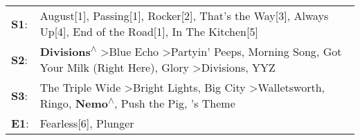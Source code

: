 \begin{supertabular}{p{0.03\textwidth}p{0.92\textwidth}}
 \textbf{S1}:  &                                                                               August[1]\textsuperscript{}, \enspace Passing[1]\textsuperscript{}, \enspace Rocker[2]\textsuperscript{}, \enspace That's the Way[3]\textsuperscript{}, \enspace Always Up[4]\textsuperscript{}, \enspace End of the Road[1]\textsuperscript{}, \enspace In The Kitchen[5]\textsuperscript{}  \enspace  \\
 \textbf{S2}:  &  \textbf{Divisions\textsuperscript{$\wedge$}} \textgreater \enspace Blue Echo\textsuperscript{} \textgreater \enspace Partyin' Peeps\textsuperscript{}, \enspace Morning Song\textsuperscript{}, \enspace Got Your Milk (Right Here)\textsuperscript{}, \enspace Glory\textsuperscript{} \textgreater \enspace Divisions\textsuperscript{}, \enspace YYZ\textsuperscript{}  \enspace  \\
 \textbf{S3}:  &                                                 The Triple Wide\textsuperscript{} \textgreater \enspace Bright Lights, Big City\textsuperscript{} \textgreater \enspace Walletsworth\textsuperscript{}, \enspace Ringo\textsuperscript{}, \enspace \textbf{Nemo\textsuperscript{$\wedge$}}, \enspace Push the Pig\textsuperscript{}, 's Theme\textsuperscript{}  \enspace  \\
 \textbf{E1}:  &                                                                                                                                                                                                                                                                                                          Fearless[6]\textsuperscript{}, \enspace Plunger\textsuperscript{}  \enspace  \\
\end{supertabular}
